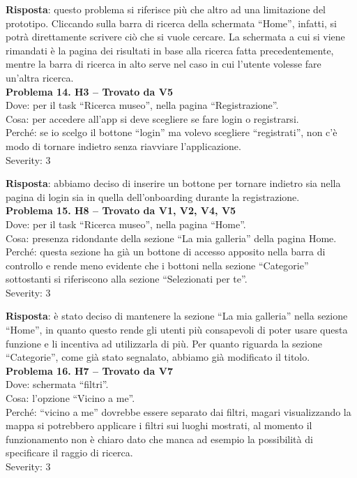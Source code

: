 \documentclass{article}
\begin{document}
\noindent \textbf{Risposta}: questo problema si riferisce più che altro ad una limitazione del prototipo. Cliccando sulla barra di ricerca della schermata “Home”, infatti, si potrà direttamente scrivere ciò che si vuole cercare. La schermata a cui si viene rimandati è la pagina dei risultati in base alla ricerca fatta precedentemente, mentre la barra di ricerca in alto serve nel caso in cui l’utente volesse fare un’altra ricerca.\\
\newpage
\noindent \textbf{Problema 14. H3 – Trovato da V5} \\
Dove: per il task “Ricerca museo”, nella pagina “Registrazione”. \\
Cosa: per accedere all’app si deve scegliere se fare login o registrarsi. \\
Perché: se io scelgo il bottone “login” ma volevo scegliere “registrati”, non c’è modo di tornare indietro senza riavviare l’applicazione. \\
Severity: 3

\noindent \textbf{Risposta}: abbiamo deciso di inserire un bottone per tornare indietro sia nella pagina di login sia in quella dell’onboarding durante la registrazione. \\

\noindent \textbf{Problema 15. H8 – Trovato da V1, V2, V4, V5} \\
Dove: per il task “Ricerca museo”, nella pagina “Home”. \\
Cosa: presenza ridondante della sezione “La mia galleria” della pagina Home. \\
Perché: questa sezione ha già un bottone di accesso apposito nella barra di controllo e rende meno evidente che i bottoni nella sezione “Categorie” sottostanti si riferiscono alla sezione “Selezionati per te”. \\
Severity: 3  

\noindent \textbf{Risposta}: è stato deciso di mantenere la sezione “La mia galleria” nella sezione “Home”, in quanto questo rende gli utenti più consapevoli di poter usare questa funzione e li incentiva ad utilizzarla di più. Per quanto riguarda la sezione “Categorie”, come già stato segnalato, abbiamo già modificato il titolo.\\

\noindent \textbf{Problema 16. H7 – Trovato da V7} \\
Dove: schermata “filtri”. \\
Cosa: l’opzione “Vicino a me”. \\
Perché: “vicino a me” dovrebbe essere separato dai filtri, magari visualizzando la mappa si potrebbero applicare i filtri sui luoghi mostrati, al momento il funzionamento non è chiaro dato che manca ad esempio la possibilità di specificare il raggio di ricerca. \\
Severity: 3
\end{document}
